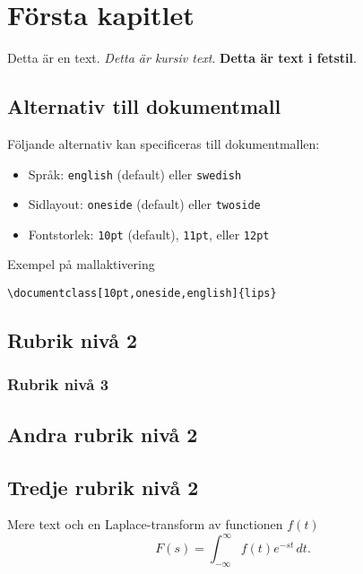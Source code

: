 \documentclass[10pt,oneside,swedish]{lips-no_customer}
\begin{document}
\cleardoublepage
{}\cfoot{\thepage}

\section{Första kapitlet}
Detta är en text. \emph{Detta är kursiv text}. \textbf{Detta är text i
  fetstil}.


\subsection{Alternativ till dokumentmall}
Följande alternativ kan specificeras till dokumentmallen:
\begin{itemize}
\item Språk: \texttt{english} (default) eller \texttt{swedish}
\item Sidlayout: \texttt{oneside} (default) eller \texttt{twoside}
\item Fontstorlek: \texttt{10pt} (default), \texttt{11pt}, eller \texttt{12pt}
\end{itemize}
Exempel på mallaktivering
\begin{verbatim}
\documentclass[10pt,oneside,english]{lips}
\end{verbatim}
\subsection{Rubrik nivå 2}
\label{sec:rubrik-niva-2}
\lipsum[7]

\subsubsection{Rubrik nivå 3}
\label{sec:rubrik-niva-3}
\lipsum[7]

\subsection{Andra rubrik nivå 2}
\lipsum[7]

\subsection{Tredje rubrik nivå 2}
Mere text och en Laplace-transform av functionen $f(t)$
\begin{equation}
  F(s) = \int_{-\infty}^{\infty} f(t)e^{-st}\,dt.
\end{equation}
\end{document}
